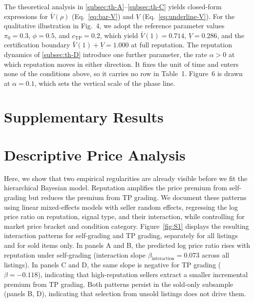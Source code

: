\documentclass[11pt,letterpaper]{article}
\theoremstyle{definition}
\newcommand{\SIresults}{%
  \section*{Supplementary Results}\label{sec:si-results-top}%
}
\begin{document}
The theoretical analysis in \ref{subsec:th-A}--\ref{subsec:th-C} yields closed-form expressions for $\bar{V}(\rho)$ (Eq.~\ref{eq:bar-V}) and $\underline{V}$ (Eq.~\ref{eq:underline-V}). For the qualitative illustration in Fig.~4, we adopt the reference parameter values $\pi_0 = 0.3$, $\phi = 0.5$, and $c_{\text{TP}} = 0.2$, which yield $\bar{V}(1) = 0.714$, $\underline{V} = 0.286$, and the certification boundary $\bar{V}(1) + \underline{V} = 1.000$ at full reputation. The reputation dynamics of \ref{subsec:th-D} introduce one further parameter, the rate $\alpha > 0$ at which reputation moves in either direction. It fixes the unit of time and enters none of the conditions above, so it carries no row in Table~1. Figure~6 is drawn at $\alpha = 0.1$, which sets the vertical scale of the phase line.

\label{sec:si-methods-end}
\FloatBarrier
\clearpage

\SIresults

\section{Descriptive Price Analysis}\label{sec:res-A}

Here, we show that two empirical regularities are already visible before we fit the hierarchical Bayesian model. Reputation amplifies the price premium from self-grading but reduces the premium from TP grading. We document these patterns using linear mixed-effects models with seller random effects, regressing the log price ratio on reputation, signal type, and their interaction, while controlling for market price bracket and condition category. Figure~\ref{fig:S1} displays the resulting interaction patterns for self-grading and TP grading, separately for all listings and for sold items only. In panels A and B, the predicted log price ratio rises with reputation under self-grading (interaction slope $\beta_{\text{interaction}} = 0.073$ across all listings). In panels C and D, the same slope is negative for TP grading ($\beta = -0.118$), indicating that high-reputation sellers extract a smaller incremental premium from TP grading. Both patterns persist in the sold-only subsample (panels B, D), indicating that selection from unsold listings does not drive them.
\end{document}
